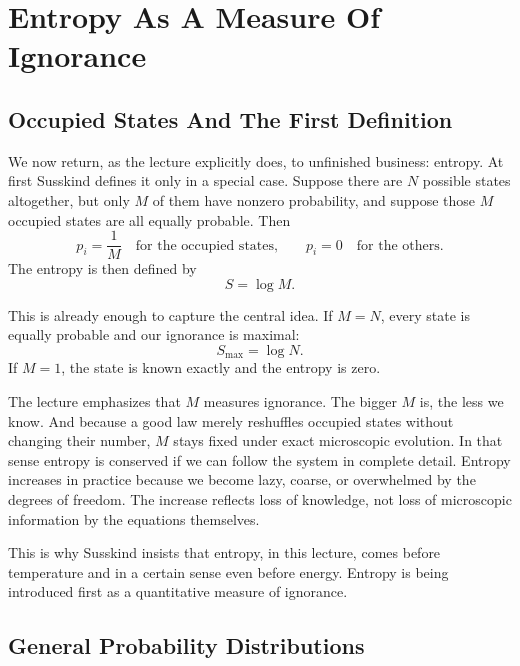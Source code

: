 \section{Entropy As A Measure Of Ignorance}

\subsection{Occupied States And The First Definition}

We now return, as the lecture explicitly does, to unfinished business: entropy. At first Susskind defines it only in a special case. Suppose there are \(N\) possible states altogether, but only \(M\) of them have nonzero probability, and suppose those \(M\) occupied states are all equally probable. Then
\begin{equation}
p_i=\frac{1}{M}
\quad\text{for the occupied states,}
\qquad
p_i=0
\quad\text{for the others.}
\end{equation}
The entropy is then defined by
\begin{equation}
S=\log M.
\end{equation}

This is already enough to capture the central idea. If \(M=N\), every state is equally probable and our ignorance is maximal:
\begin{equation}
S_{\max}=\log N.
\end{equation}
If \(M=1\), the state is known exactly and the entropy is zero.

The lecture emphasizes that \(M\) measures ignorance. The bigger \(M\) is, the less we know. And because a good law merely reshuffles occupied states without changing their number, \(M\) stays fixed under exact microscopic evolution. In that sense entropy is conserved if we can follow the system in complete detail. Entropy increases in practice because we become lazy, coarse, or overwhelmed by the degrees of freedom. The increase reflects loss of knowledge, not loss of microscopic information by the equations themselves.

This is why Susskind insists that entropy, in this lecture, comes before temperature and in a certain sense even before energy. Entropy is being introduced first as a quantitative measure of ignorance.

\subsection{General Probability Distributions}

